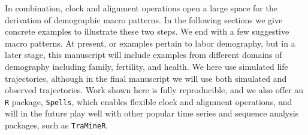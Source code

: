 \documentclass{article}
\begin{document}
In combination, clock and alignment operations open a large space for the derivation of demographic macro patterns. In the following sections we give concrete examples to illustrate these two steps. We end with a few suggestive macro patterns. At present, or examples pertain to labor demography, but in a later stage, this manuscript will include examples from different domains of demography including family, fertility, and health. We here use simulated life trajectories, although in the final manuscript we will use both simulated and observed trajectories. Work shown here is fully reproducible, and we also offer an \texttt{R} package, \texttt{Spells}, which enables flexible clock and alignment operations, and will in the future play well with other popular time series and sequence analysis packages, such as \texttt{TraMineR}.
% 

\end{document}
